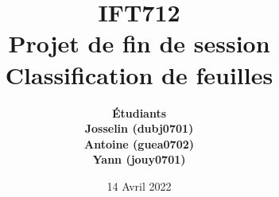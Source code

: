 \usepackage[left=2cm,right=2cm,top=4cm,bottom=2.5cm]{geometry}
\usepackage[french]{babel}



\usepackage{xcolor}



\usepackage[hidelinks]{hyperref}
\hypersetup{
    colorlinks=true,
    allcolors=gris_,
    linktoc=all
}
\usepackage{float}


\usepackage{fontspec}
\setmainfont{Roboto}



\author{
    \bf{Étudiants}\\Josselin {} (dubj0701)\\Antoine {} (guea0702)\\Yann {} (jouy0701)\\
}

\date{
    14 Avril 2022
}


\title{
    \vfill
    IFT712\\
    Projet de fin de session\\
    \vspace{2cm}
    \bf{Classification de feuilles}
    \vspace{2cm}
}



\pagestyle{plain}


